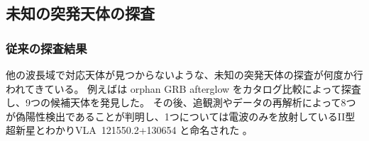 \subsection{未知の突発天体の探査} \label{transients.s3.unknowns}
{ %
\newcommand{\suffix}[2]{^{> #1 \, \text{mJy}} _{#2 \, \text{GHz}}}
\newcommand{\ntt}{那須 20~m 電波望遠鏡}
\newcommand{\WJN}{WJN J1443+3439}
\newcommand{\FDR}{{\it FDR}}
\newcommand{\siglevel}{\mbox{$10^{-5}$}~}
\newcommand{\ssd}{天球面密度}

\subsubsection{従来の探査結果}
他の波長域で対応天体が見つからないような、未知の突発天体の探査が何度か行われてきている。
例えば\citet{2002ApJ...576..923L}は orphan GRB afterglow をカタログ比較によって探査し、9つの候補天体を発見した。
その後、追観測やデータの再解析によって8つが偽陽性検出であることが判明し、1つについては電波のみを放射しているII型超新星とわかりVLA~121550.2+130654 と命名された \citep{2006ApJ...639..331G,2010ApJ...711..517O}。

}
